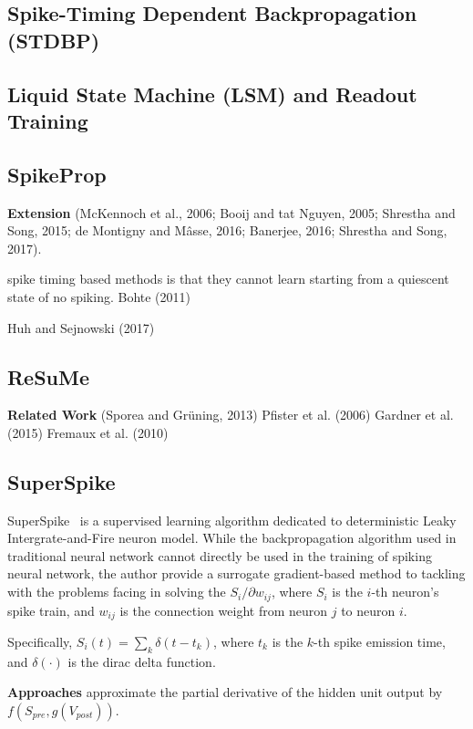 \subsection{Spike-Timing Dependent Backpropagation (STDBP)}

\subsection{Liquid State Machine (LSM) and Readout Training}

\subsection{SpikeProp}



\textbf{Extension}
(McKennoch et al., 2006; Booij and tat Nguyen, 2005; Shrestha and Song, 2015; de Montigny and Mâsse, 2016; Banerjee, 2016; Shrestha and Song, 2017).

spike timing based methods is that they cannot learn starting from a quiescent state of no spiking.
Bohte (2011)

Huh and Sejnowski (2017)

\subsection{ReSuMe}
\textbf{Related Work}
(Sporea and Grüning, 2013)
Pfister et al. (2006)
Gardner et al. (2015)
Fremaux et al. (2010)


\subsection{SuperSpike}
SuperSpike~\cite{super-spike} is a supervised learning algorithm dedicated to deterministic
 Leaky Intergrate-and-Fire neuron model. While the backpropagation algorithm used in 
 traditional neural network cannot directly be used in the training of spiking neural network,
 the author provide a surrogate gradient-based method to tackling with the problems facing
 in solving the $S_i/\partial w_{ij}$, where $S_i$ is the $i$-th neuron's spike train, and 
 $w_{ij}$ is the connection weight from neuron $j$ to neuron $i$.

 Specifically, $S_i(t) = \sum_{k} \delta(t - t_k)$, where $t_k$ is the $k$-th spike emission time,
 and $\delta(\cdot)$ is the dirac delta function.


\textbf{Approaches}
approximate the partial derivative of the hidden unit output by $f(S_{pre},  g(V_{post}))$.

